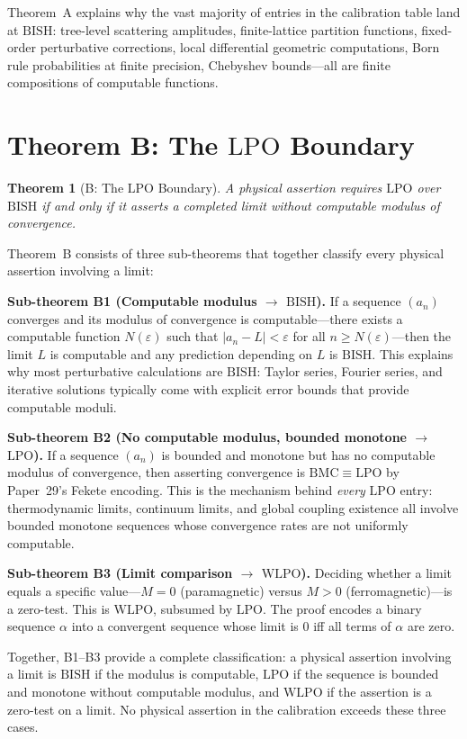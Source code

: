 \documentclass[11pt,a4paper]{report}
\theoremstyle{plain}
\newtheorem{theorem}{Theorem}[chapter]
\theoremstyle{definition}
\theoremstyle{remark}
\newcommand{\BISH}{\mathrm{BISH}}
\newcommand{\WLPO}{\mathrm{WLPO}}
\newcommand{\LPO}{\mathrm{LPO}}
\newcommand{\BMC}{\mathrm{BMC}}
\begin{document}
Theorem~A explains why the vast majority of entries in the calibration table land at $\BISH$: tree-level scattering amplitudes, finite-lattice partition functions, fixed-order perturbative corrections, local differential geometric computations, Born rule probabilities at finite precision, Chebyshev bounds---all are finite compositions of computable functions.

\section{Theorem B: The $\LPO$ Boundary}

\begin{theorem}[B: The $\LPO$ Boundary]
A physical assertion requires $\LPO$ over $\BISH$ if and only if it asserts a completed limit without computable modulus of convergence.
\end{theorem}

Theorem~B consists of three sub-theorems that together classify every physical assertion involving a limit:

\textbf{Sub-theorem B1 (Computable modulus $\to$ $\BISH$).} If a sequence $(a_n)$ converges and its modulus of convergence is computable---there exists a computable function $N(\varepsilon)$ such that $|a_n - L| < \varepsilon$ for all $n \geq N(\varepsilon)$---then the limit $L$ is computable and any prediction depending on $L$ is $\BISH$. This explains why most perturbative calculations are $\BISH$: Taylor series, Fourier series, and iterative solutions typically come with explicit error bounds that provide computable moduli.

\textbf{Sub-theorem B2 (No computable modulus, bounded monotone $\to$ $\LPO$).} If a sequence $(a_n)$ is bounded and monotone but has no computable modulus of convergence, then asserting convergence is $\BMC \equiv \LPO$ by Paper~29's Fekete encoding. This is the mechanism behind \emph{every} $\LPO$ entry: thermodynamic limits, continuum limits, and global coupling existence all involve bounded monotone sequences whose convergence rates are not uniformly computable.

\textbf{Sub-theorem B3 (Limit comparison $\to$ $\WLPO$).} Deciding whether a limit equals a specific value---$M = 0$ (paramagnetic) versus $M > 0$ (ferromagnetic)---is a zero-test. This is $\WLPO$, subsumed by $\LPO$. The proof encodes a binary sequence $\alpha$ into a convergent sequence whose limit is $0$ iff all terms of $\alpha$ are zero.

Together, B1--B3 provide a complete classification: a physical assertion involving a limit is $\BISH$ if the modulus is computable, $\LPO$ if the sequence is bounded and monotone without computable modulus, and $\WLPO$ if the assertion is a zero-test on a limit. No physical assertion in the calibration exceeds these three cases.
\end{document}
